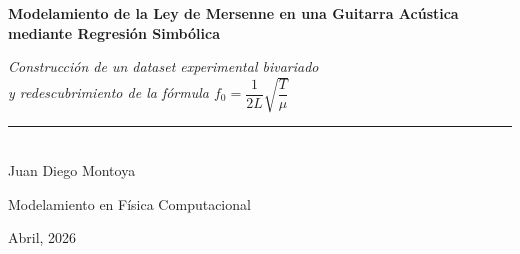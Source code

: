 \documentclass[12pt,a4paper]{article}
\begin{document}

\begin{titlepage}
  \centering
  \vspace*{1.5cm}
  {\LARGE\bfseries\color{blue!70!black}
    Modelamiento de la Ley de Mersenne en una Guitarra Acústica\\[0.4em]
    mediante Regresión Simbólica
  }\par
  \vspace{1.2cm}
  {\large\itshape
    Construcción de un \emph{dataset} experimental bivariado\\
    y redescubrimiento de la fórmula $f_0 = \dfrac{1}{2L}\sqrt{\dfrac{T}{\mu}}$
  }\par
  \vspace{1.5cm}
  \rule{0.6\textwidth}{0.6pt}\\[0.8cm]
  {\large Juan Diego Montoya}\par
  \vspace{0.4cm}
  {\normalsize Modelamiento en Física Computacional}\par
  \vspace{0.3cm}
  {\normalsize\color{gray} Abril, 2026}\par
  \vspace{2cm}
  \begin{abstract}
    \noindent
    Se presenta el proceso completo de modelamiento de la \textbf{Ley de
    Mersenne} para cuerdas vibrantes utilizando datos obtenidos
    experimentalmente en una guitarra acústica D'Addario EJ16.
    Se extrajeron frecuencias fundamentales $f_0$ mediante la
    Transformada Rápida de Fourier (FFT) en 120 grabaciones de audio
    (6 cuerdas $\times$ 20 trastes). A continuación, cada variable de la
    ley de Mersenne fue estudiada de forma \emph{estrictamente
    bivariada}: $f_0(L)$ con ajuste potencial log-log, $f_0(\mu)$
    aprovechando la variedad de cuerdas del juego, y $f_0(T)$ mediante
    medición experimental de tensión con un diagrama de cuerpo libre.
    Finalmente, se aplicó regresión simbólica (log-lineal multivariable
    más búsqueda genética con \texttt{gplearn}) sobre el \emph{dataset}
    combinado. Los exponentes recuperados
    $b_L = -0.999$, $b_\mu = -0.473$, $b_T = +0.441$
    convergen hacia los valores teóricos de Mersenne
    $(-1,\,-\tfrac{1}{2},\,+\tfrac{1}{2})$ con un coeficiente de
    determinación $R^2 = 0.992$ en el modelo conjunto.
  \end{abstract}
\end{titlepage}
\end{document}
